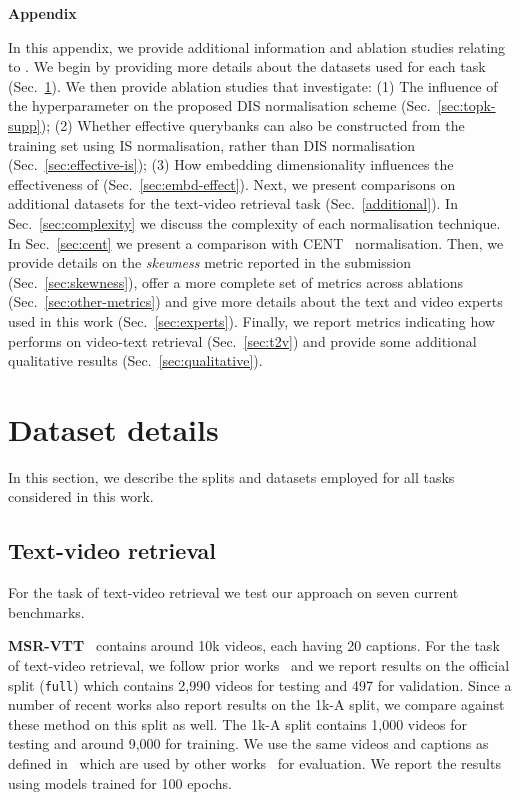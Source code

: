 \appendix
\begin{center}
\textbf{\Large Appendix}
\end{center}

In this appendix, we provide additional information and ablation studies
relating to \methodName.
We begin by providing more details about the datasets used
for each task (Sec.~\ref{sec:dataset-detils}).
We then provide ablation studies that investigate:
(1) The influence of the  hyperparameter on the proposed
DIS normalisation scheme (Sec.~\ref{sec:topk-supp});
(2) Whether effective querybanks can also be constructed from the
training set using IS normalisation,
rather than DIS normalisation (Sec.~\ref{sec:effective-is});
(3) How embedding dimensionality influences the effectiveness
of \methodName (Sec.~\ref{sec:embd-effect}).
Next, we present comparisons on additional datasets for the text-video retrieval task (Sec.~\ref{additional}). 
In Sec.~\ref{sec:complexity} we discuss the
complexity of each normalisation technique.
In Sec.~\ref{sec:cent} we present a comparison
with CENT~\cite{suzuki2013centering} normalisation.
Then, we provide details on the \textit{skewness}
metric reported in the submission (Sec.~\ref{sec:skewness}),
offer a more complete set of metrics
across ablations (Sec.~\ref{sec:other-metrics})
and
give more details about the text and video experts used in
this work (Sec.~\ref{sec:experts}).
Finally, we report metrics indicating how \methodName performs on
video-text retrieval (Sec.~\ref{sec:t2v})
and provide some additional qualitative
results (Sec.~\ref{sec:qualitative}).


\section{Dataset details}
\label{sec:dataset-detils}
In this section, we describe the splits and datasets employed for all tasks considered in this work.

\subsection{Text-video retrieval}
For the task of text-video retrieval we test our approach on seven current benchmarks.

\indent \textbf{MSR-VTT}~\cite{xu2016msr} contains around
10k videos, each having 20 captions.
For the task of text-video retrieval,
we follow prior works~\cite{liu2019use, croitoru2021teachtext}
and we report results on the official split (\texttt{full}) which
contains 2,990 videos for testing and 497 for validation.
Since a number of recent works
\cite{liu2019use,gabeur2020multi,patrick2020support,croitoru2021teachtext} 
also report results on the 1k-A split,
we compare against these method on this split as well.
The 1k-A split contains 1,000 videos for testing
and around 9,000 for training.
We use the same videos and captions as defined in~\cite{liu2019use} which are used by other works~\cite{yu2018joint,gabeur2020multi,patrick2020support} for evaluation.
We report the results using models trained for 100 epochs.

